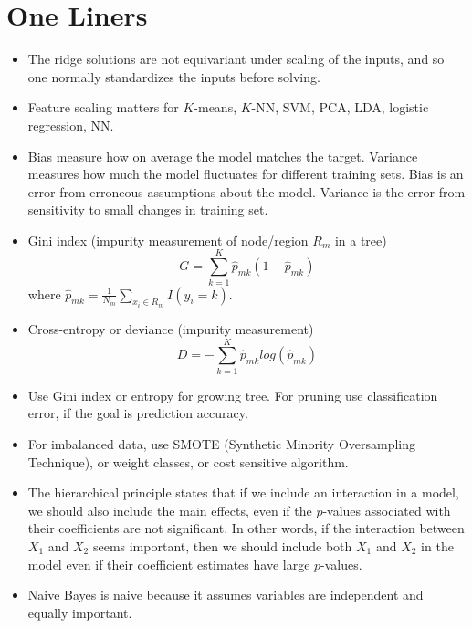 \section{One Liners}
\begin{itemize}
\item The ridge solutions are not equivariant under scaling of the 
inputs, and so one normally standardizes the inputs before solving.

\item Feature scaling matters  for $K$-means, $K$-NN, SVM, PCA, LDA, logistic regression, NN.

\item Bias measure how on average the model matches the target. Variance measures
how much the model fluctuates for different training sets.
Bias is an error from erroneous assumptions about the model.
Variance is the error from sensitivity to small changes in training set.

\item Gini index (impurity measurement of node/region $R_m$ in a tree)
\begin{equation}\label{eq:GiniIndex}
G = \sum_{k=1}^K \hat p_{mk} (1-\hat p_{mk})
\end{equation}
where $\hat p_{mk} = \frac{1}{N_m} \sum_{x_i \in R_m} I(y_i = k)$.
\item Cross-entropy or deviance (impurity measurement)
\begin{equation}\label{eq:entropyIndex}
D = - \sum_{k=1}^K \hat p_{mk} log(\hat p_{mk})
\end{equation}

\item Use Gini index or entropy for growing tree. For pruning use
classification error, if the goal is prediction accuracy.

\item For imbalanced data, use SMOTE (Synthetic Minority Oversampling Technique),
or weight classes, or cost sensitive algorithm.

\item The hierarchical principle states that if we include 
an interaction in a model, we should also include 
the main effects, even if the $p$-values associated with 
their coefficients are not significant. In other words, if the 
interaction between $X_1$ and $X_2$ seems important, then 
we should include both $X_1$ and $X_2$ in the 
model even if their coefficient estimates have large $p$-values.

\item Naive Bayes is naive because it assumes variables are
independent and equally important.


\end{itemize}
